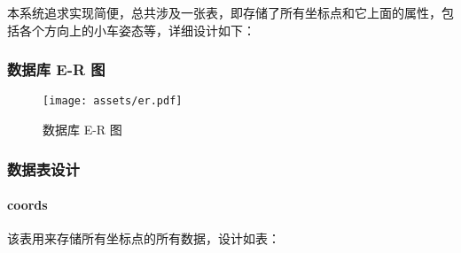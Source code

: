 本系统追求实现简便，总共涉及一张表，即存储了所有坐标点和它上面的属性，包括各个方向上的小车姿态等，详细设计如下：

\subsubsection{数据库 E-R 图}

\begin{figure}[H]
  \centering
  \texttt{[image: assets/er.pdf]}
  \caption{数据库 E-R 图}
  \label{fig:er}
\end{figure}

\subsubsection{数据表设计}

\paragraph{coords}

该表用来存储所有坐标点的所有数据，设计如表：

